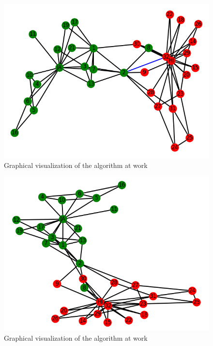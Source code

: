 \documentclass[11pt]{article}
\begin{document}
	\begin{figure}[h!]
		\includegraphics[scale=0.5]{resources/myplot12.png}
		\caption{Graphical visualization of the algorithm at work }
	\end{figure}
	\begin{figure}[h!]
		\includegraphics[scale=0.5]{resources/myplot11.png}
		\caption{Graphical visualization of the algorithm at work }
	\end{figure}
\end{document}
